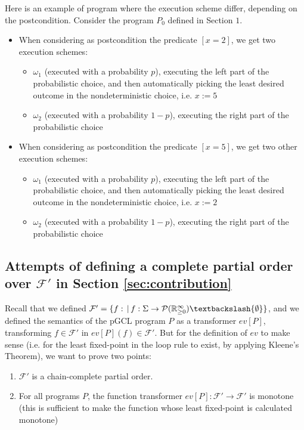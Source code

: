 \documentclass[a4paper,10pt]{llncs}
\def\RRposi {{\mathbb R_{\geq 0}^{\infty}}}
\begin{document}
\begin{example}
\label{ex:diff_ex_sch}
Here is an example of program where the execution scheme differ, depending on the postcondition.
Consider the program $P_0$ defined in Section $1$.
\begin{itemize}
\item When considering as postcondition the predicate $[x = 2]$, we get two execution schemes:
\begin{itemize}
\item $\omega_1$ (executed with a probability $p$), executing the left part of the probabilistic choice, and then automatically picking the least desired outcome in the nondeterministic choice, i.e. $x := 5$
\item $\omega_2$ (executed with a probability $1-p$), executing the right part of the probabilistic choice
\end{itemize}
\item When considering as postcondition the predicate $[x = 5]$, we get two other execution schemes:
\begin{itemize}
\item $\omega_1$ (executed with a probability $p$), executing the left part of the probabilistic choice, and then automatically picking the least desired outcome in the nondeterministic choice, i.e. $x := 2$
\item $\omega_2$ (executed with a probability $1-p$), executing the right part of the probabilistic choice
\end{itemize}
\end{itemize}
\end{example}

\subsection{Attempts of defining a complete partial order over $\mathcal{F}'$ in Section \ref{sec:contribution}}
\label{subsec:attempts}
Recall that we defined $\mathcal{F}' = \{f : \,|\, f : \Sigma \rightarrow \mathcal{P}(\RRposi)\textbackslash\{\emptyset\} \}$, and we defined the semantics of the pGCL program $P$ as a transformer $ev[P]$, transforming $f \in \mathcal{F'}$ in $ev[P](f) \in \mathcal{F}'$. But for the definition of $ev$ to make sense (i.e. for the least fixed-point in the loop rule to exist, by applying Kleene's Theorem), we want to prove two points:
\begin{enumerate}
\item $\mathcal{F}'$ is a chain-complete partial order.
\item For all programs $P$, the function transformer $ev[P] : \mathcal{F}' \rightarrow \mathcal{F}'$ is monotone (this is sufficient to make the function whose least fixed-point is calculated monotone)
\end{enumerate}
\bigskip
\end{document}
